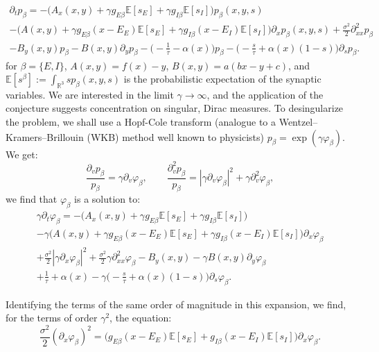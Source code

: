 \documentclass[onefignum,onetabnum]{siamart190516}
\newcommand{\R}{\mathbb{R}}
\newcommand{\1}{\mathbbm{1}}
\newcommand{\review}[1]{\textcolor{midblue}{ #1}}
\renewcommand{\review}[1]{{ #1}}
\begin{document}
	\begin{multline*}
		\partial_t p_\beta = -\Big(A_x(x,y)+\gamma g_{E\beta} \mathbb{E}[s_E]+\gamma g_{I\beta}\mathbb{E}[ s_I]\Big)p_\beta(x,y,s)\\
		-\Big(A(x,y)+\gamma g_{E\beta} (x-E_E)\mathbb{E}[ s_E]+\gamma g_{I\beta} (x-E_I)\mathbb{E}[ s_I]\Big)\partial_xp_\beta(x,y,s)+\frac{\sigma^2}{2}\partial_{xx}^2 p_\beta\\
		-B_y(x,y)p_\beta-B(x,y)\partial_y p_\beta-\Big(-\frac{1}{\tau}-\alpha(x)\Big)p_\beta-\Big(-\frac{s}{\tau}+\alpha(x)(1-s)\Big)\partial_sp_\beta.
	\end{multline*}
	for $\beta=\{E,I\}$, $A(x,y)=f(x)-y$, $B(x,y)=a(bx-y+c)$, and $\mathbb{E}[ s^\beta]:=\int_{\R^3} s p_\beta(x,y,s)$ is the probabilistic expectation of the synaptic variables. \review{We are interested in the limit $\gamma \to \infty$, and the application of the conjecture suggests concentration on singular, Dirac measures. To desingularize the problem, we shall use a Hopf-Cole transform (analogue to a Wentzel–Kramers–Brillouin (WKB) method well known to physicists)} $
	p_\beta=\exp\left(\gamma \varphi_\beta\right) $. We get:
	$$
	\frac{\partial_v p_\beta}{p_\beta} = \gamma \partial_v\varphi_\beta,\qquad \frac{\partial^2_v p_\beta}{p_\beta} = \left|\gamma \partial_v \varphi_\beta \right|^2+\gamma \partial^2_v \varphi_\beta,
	$$
 	we find that $\varphi_\beta$ is a solution to:
	\begin{multline*}
		\gamma \partial_t \varphi_\beta = -\Big(A_x(x,y)+\gamma g_{E\beta} \mathbb{E}[ s_E]+\gamma g_{I\beta} \mathbb{E}[  s_I]\Big)\\
		-\gamma \Big(A(x,y)+\gamma  g_{E\beta} (x-E_E) \mathbb{E}[  s_E]+\gamma g_{I\beta} (x-E_I)\mathbb{E}[  s_I]\Big)\partial_x\varphi_\beta
		\\
		+\frac{\sigma^2}{2} \left|\gamma \partial_x \varphi_\beta\right|^2+\frac{\sigma^2}{2}\gamma \partial^2_{xx} \varphi_\beta-B_y(x,y)-\gamma B(x,y)\partial_y\varphi_\beta\\
		+\frac{1}{\tau}+\alpha(x)-\gamma \Big(-\frac{s}{\tau}+\alpha(x)(1-s)\Big)\partial_s\varphi_\beta.
	\end{multline*}

Identifying the terms of the same order of magnitude in this expansion, we find, for the terms of order $\gamma^{2}$, the equation:
\[
\frac{\sigma^2}{2}(\partial_x \varphi_\beta)^2=\Big(g_{E\beta} (x-E_E)\mathbb{E}[  s_E]+g_{I\beta} (x-E_I)\mathbb{E}[  s_I]\Big)\partial_x\varphi_\beta.
\]
\end{document}
